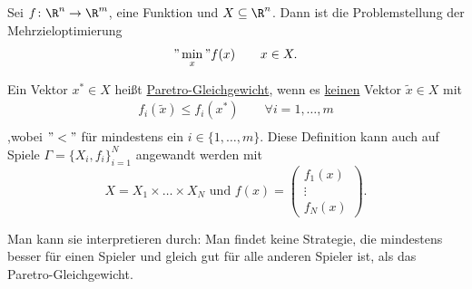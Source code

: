 Sei $f \colon \R^{n} \rightarrow \R^{m}$, eine Funktion und $X \subseteq \R^{n}$. Dann ist die Problemstellung der Mehrzieloptimierung
\[
	"\min\limits_{x}" f(x) \qquad \mit x \in X
.\] 

\begin{definition}
	Ein Vektor $x^{*} \in X$ heißt \underline{Paretro-Gleichgewicht}, wenn es \underline{keinen} Vektor $\tilde{x} \in X$ mit
	\begin{align*}
	f_{i}(\tilde{x}) \leq f_{i}(x^{*}) \qquad
	\forall i=1, \ldots, m \\
	\end{align*}
	,wobei $"<"$ für mindestens ein $ i \in \{1, \ldots, m\}$.
	Diese Definition kann auch auf Spiele $\Gamma = \{X_{i},f_{i}\}_{i=1}^{N}$ angewandt werden mit 
	\[
	X=X_1 \times \ldots \times X_{N} \text{ und }f(x) = \begin{pmatrix}
		f_1(x) \\
		\vdots \\
		f_{N}(x)
	\end{pmatrix}
	.\]

	Man kann sie interpretieren durch: Man findet keine Strategie, die mindestens besser für einen Spieler und gleich gut für alle anderen Spieler ist, als das Paretro-Gleichgewicht.
\end{definition}

